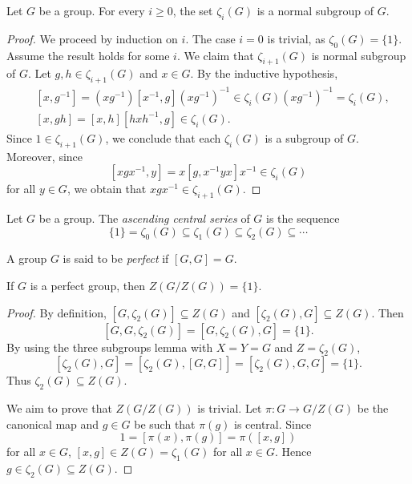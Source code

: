 \begin{lemma}
\label{lem:central_ascendente}
Let $G$ be a group. For every $i\geq0$, the set $\zeta_i(G)$ 
is a normal subgroup of $G$. 
\end{lemma}

\begin{proof}
We proceed by induction on $i$. The case $i=0$ is trivial, as 
$\zeta_0(G)=\{1\}$. Assume the result holds for some $i$.
We claim that $\zeta_{i+1}(G)$ is normal subgroup of $G$. 
Let $g,h\in \zeta_{i+1}(G)$ and $x\in G$. By the inductive hypothesis, 
\begin{align*}
	&[x,g^{-1}]=(xg^{-1})[x^{-1},g](xg^{-1})^{-1}\in\zeta_i(G)(xg^{-1})^{-1}=\zeta_i(G),\\
	&[x,gh]=[x,h][hxh^{-1},g]\in \zeta_{i}(G).
\end{align*}
Since $1\in\zeta_{i+1}(G)$, we conclude that each $\zeta_i(G)$ is a subgroup of $G$. 
Moreover, since 
	\[
	[xgx^{-1},y]=x[g,x^{-1}yx]x^{-1}\in\zeta_{i}(G)
	\]
for all $y\in G$, we obtain that $xgx^{-1}\in\zeta_{i+1}(G)$. 
\end{proof}

\begin{definition}
Let $G$ be a group. The \emph{ascending central series} of $G$ 
is the sequence 
\[
\{1\}=\zeta_0(G)\subseteq\zeta_1(G)\subseteq\zeta_2(G)\subseteq\cdots
\]
\end{definition}

\begin{definition}
A group $G$ is said to be \emph{perfect} if $[G,G]=G$.
\end{definition}

\begin{theorem}[Gr\"un]
\label{thm:Grun}
If $G$ is a perfect group, then $Z(G/Z(G))=\{1\}$. 
\end{theorem}

\begin{proof}
    By definition, $[G,\zeta_2(G)]\subseteq Z(G)$ and 
    $[\zeta_2(G),G]\subseteq Z(G)$. Then 
    \[
    [G,G,\zeta_2(G)]=[G,\zeta_2(G),G]=\{1\}.
    \]
    By using the three subgroups lemma with $X=Y=G$ and $Z=\zeta_2(G)$, 
    \[
    [\zeta_2(G),G]=[\zeta_2(G),[G,G]]=[\zeta_2(G),G,G]=\{1\}.
    \]
    Thus $\zeta_2(G)\subseteq Z(G)$. 
    
    We aim to prove that $Z(G/Z(G))$ is trivial. Let $\pi\colon G\to G/Z(G)$ be the canonical map and 
    $g\in G$ be such that $\pi(g)$ is central. Since 
    \[
    1=[\pi(x),\pi(g)]=\pi([x,g])
    \]
    for all $x\in G$, $[x,g]\in Z(G)=\zeta_1(G)$ for all $x\in G$. Hence 
    $g\in\zeta_2(G)\subseteq Z(G)$. 
\end{proof}

